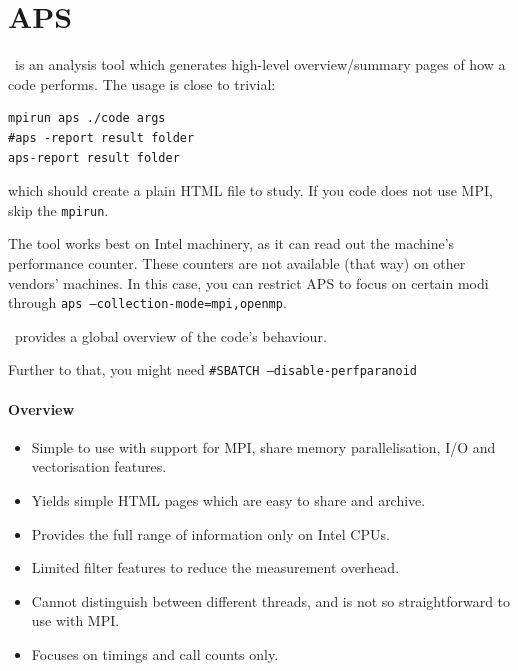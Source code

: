 \section{APS}

\aps~is an analysis tool which generates high-level overview/summary pages of how a code performs.
The usage is close to trivial:

\begin{verbatim}
mpirun aps ./code args
#aps -report result folder
aps-report result folder
\end{verbatim}

\noindent
which should create a plain HTML file to study.
If you code does not use MPI, skip the \texttt{mpirun}.


The tool works best on Intel machinery, as it can read out the machine's performance counter.
These counters are not available (that way) on other vendors' machines.
In this case, you can restrict APS to focus on certain modi through \texttt{aps --collection-mode=mpi,openmp}.

\aps~provides a global overview of the code's behaviour.

Further to that, you might need \texttt{\#SBATCH --disable-perfparanoid}


\paragraph*{Overview}
 
\begin{itemize}[noitemsep]
  \item[$\boxplus$] Simple to use with support for MPI, share memory parallelisation, I/O and vectorisation features.
  \item[$\boxplus$] Yields simple HTML pages which are easy to share and archive.
\end{itemize}
 
 
\begin{itemize}[noitemsep]
  \item[$\boxminus$] Provides the full range of information only on Intel CPUs.
  \item[$\boxminus$] Limited filter features to reduce the measurement overhead.
  \item[$\boxminus$] Cannot distinguish between different threads, and is not so
  straightforward to use with MPI. 
  \item[$\boxminus$] Focuses on timings and call counts only.
\end{itemize}

